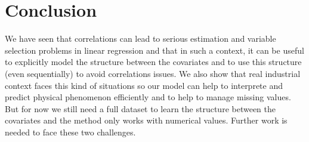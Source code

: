 \documentclass[11pt,a4paper]{article}
\begin{document}
\section{Conclusion}
	We have seen that correlations can lead to serious estimation and variable selection problems in linear regression and that in such a context, it can be useful to explicitly model the structure between the covariates and to use this structure (even sequentially) to avoid correlations issues. We also show that real industrial context faces this kind of situations so our model can help to interprete and predict physical phenomenon efficiently and to help to manage missing values. But for now we still need a full dataset to learn the structure between the covariates and the method only works with numerical values. Further work is needed to face these two challenges.
	
{}

\end{document}
